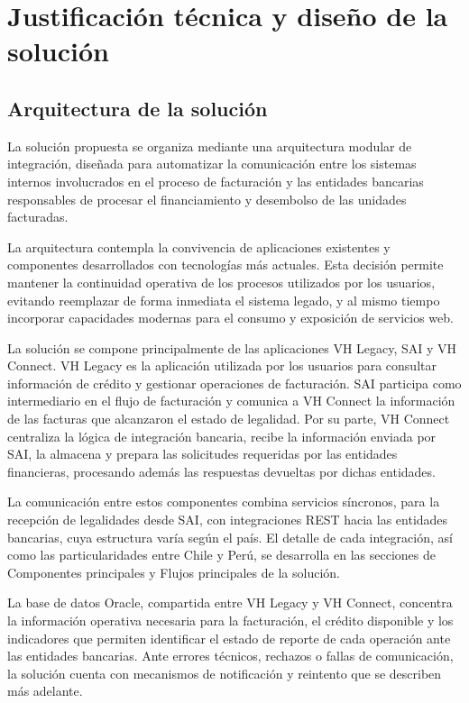 \chapter{Justificación técnica y diseño de la solución}\label{cap:marco-tecnologico}

\section{Arquitectura de la solución}

La solución propuesta se organiza mediante una arquitectura modular de integración, diseñada para automatizar la comunicación entre los sistemas internos involucrados en el proceso de facturación y las entidades bancarias responsables de procesar el financiamiento y desembolso de las unidades facturadas.

La arquitectura contempla la convivencia de aplicaciones existentes y componentes desarrollados con tecnologías más actuales. Esta decisión permite mantener la continuidad operativa de los procesos utilizados por los usuarios, evitando reemplazar de forma inmediata el sistema legado, y al mismo tiempo incorporar capacidades modernas para el consumo y exposición de servicios web.

La solución se compone principalmente de las aplicaciones VH Legacy, SAI y VH Connect. VH Legacy es la aplicación utilizada por los usuarios para consultar información de crédito y gestionar operaciones de facturación. SAI participa como intermediario en el flujo de facturación y comunica a VH Connect la información de las facturas que alcanzaron el estado de legalidad. Por su parte, VH Connect centraliza la lógica de integración bancaria, recibe la información enviada por SAI, la almacena y prepara las solicitudes requeridas por las entidades financieras, procesando además las respuestas devueltas por dichas entidades.

La comunicación entre estos componentes combina servicios síncronos, para la recepción de legalidades desde SAI, con integraciones REST hacia las entidades bancarias, cuya estructura varía según el país. El detalle de cada integración, así como las particularidades entre Chile y Perú, se desarrolla en las secciones de Componentes principales y Flujos principales de la solución.

La base de datos Oracle, compartida entre VH Legacy y VH Connect, concentra la información operativa necesaria para la facturación, el crédito disponible y los indicadores que permiten identificar el estado de reporte de cada operación ante las entidades bancarias. Ante errores técnicos, rechazos o fallas de comunicación, la solución cuenta con mecanismos de notificación y reintento que se describen más adelante.

